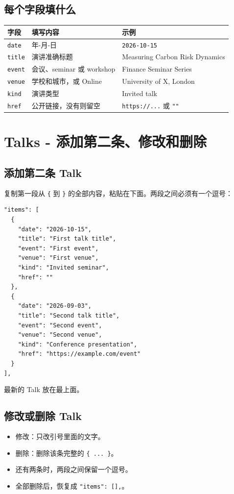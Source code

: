 \documentclass[10pt,a4paper]{article}
\begin{document}
\subsection{每个字段填什么}

\begin{tabularx}{\linewidth}{L{25mm}Y L{43mm}}
\toprule
\textbf{字段} & \textbf{填写内容} & \textbf{示例}\\
\midrule
\texttt{date} & 年-月-日 & \texttt{2026-10-15}\\
\texttt{title} & 演讲准确标题 & Measuring Carbon Risk Dynamics\\
\texttt{event} & 会议、seminar 或 workshop & Finance Seminar Series\\
\texttt{venue} & 学校和城市，或 Online & University of X, London\\
\texttt{kind} & 演讲类型 & Invited talk\\
\texttt{href} & 公开链接，没有则留空 & \texttt{https://...} 或 \texttt{""}\\
\bottomrule
\end{tabularx}

\clearpage
\section{Talks - 添加第二条、修改和删除}

\subsection{添加第二条 Talk}

复制第一段从 \texttt{\{} 到 \texttt{\}} 的全部内容，粘贴在下面。两段之间必须有一个逗号：

\begin{lstlisting}
"items": [
  {
    "date": "2026-10-15",
    "title": "First talk title",
    "event": "First event",
    "venue": "First venue",
    "kind": "Invited seminar",
    "href": ""
  },
  {
    "date": "2026-09-03",
    "title": "Second talk title",
    "event": "Second event",
    "venue": "Second venue",
    "kind": "Conference presentation",
    "href": "https://example.com/event"
  }
],
\end{lstlisting}

最新的 Talk 放在最上面。

\subsection{修改或删除 Talk}

\begin{itemize}
  \item 修改：只改引号里面的文字。
  \item 删除：删除该条完整的 \texttt{\{ ... \}}。
  \item 还有两条时，两段之间保留一个逗号。
  \item 全部删除后，恢复成 \texttt{"items": [],}。
\end{itemize}
\end{document}
